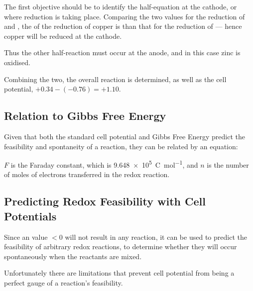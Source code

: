			The first objective should be to identify the half-equation at the cathode, or where reduction is taking place. Comparing the two \Eo{}
			values for the reduction of  and , the \Eo{} of the reduction of copper is  than that for
			the reduction of  --- hence copper will be reduced at the cathode.

			Thus the other half-reaction must occur at the anode, and in this case zinc is oxidised.

			Combining the two, the overall reaction is determined, as well as the cell potential, $+0.34 - (-0.76) = +1.10$.




		\subsection{Relation to Gibbs Free Energy}

			Given that both the standard cell potential and Gibbs Free Energy predict the feasibility and spontaneity of a reaction, they can
			be related by an equation:

			\mathdiagram{
				\[ \Delta G^{\stdst} = -nF\MEcell \]
			}

			$F$ is the Faraday constant, which is \SI{9.648e5}{\coulomb\per\mole}, and $n$ is the number of moles of electrons transferred in the
			redox reaction.



		\pagebreak
		\subsection{Predicting Redox Feasibility with Cell Potentials}

			Since an \Ecell{} value $ < 0$ will not result in any reaction, it can be used to predict the feasibility of arbitrary redox
			reactions, to determine whether they will occur spontaneously when the reactants are mixed.

			Unfortunately there are limitations that prevent cell potential from being a perfect gauge of a reaction's feasibility.

